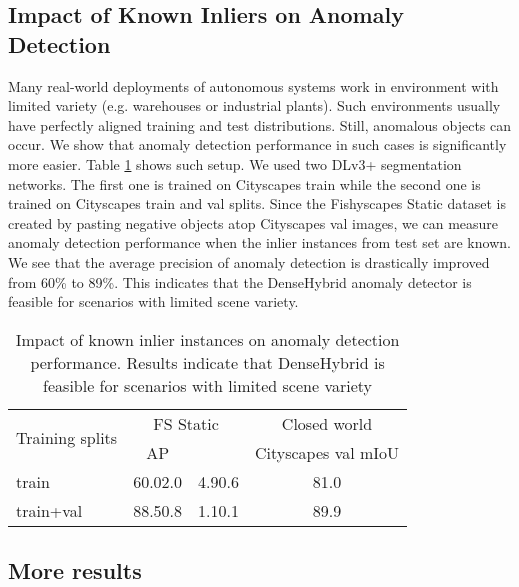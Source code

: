 \documentclass[runningheads]{llncs}
\begin{document}
\subsection{Impact of Known Inliers on Anomaly Detection}
Many real-world deployments of autonomous systems work in environment with limited variety (e.g. warehouses or industrial plants).
Such environments usually have perfectly aligned training and test distributions.
Still, anomalous objects can occur.
We show that anomaly detection performance in such cases is significantly more easier.
Table \ref{table:cityval} shows such setup.
We used two DLv3+ segmentation networks.
The first one is trained on Cityscapes train while the second one is trained on Cityscapes train and val splits.
Since the Fishyscapes Static dataset is created by pasting negative objects atop Cityscapes val images, we can measure anomaly detection performance when the inlier instances from test set are known.
We see that the average precision of anomaly detection is drastically improved from 60\% to 89\%.
This indicates that the DenseHybrid anomaly detector is feasible for scenarios with limited scene variety.
\begin{table}[h]
\begin{center}
\caption{
Impact of known inlier instances on anomaly detection performance.
Results indicate that DenseHybrid is feasible for scenarios with limited scene variety}
\label{table:cityval}
\begin{tabular}{lccc}
\hline \hline
\multirow{2}{*}{Training splits} & \multicolumn{2}{c|}{FS Static} & Closed world \\
 &  AP & \multicolumn{1}{c|}{} & Cityscapes val mIoU\\ \hline \hline
train  & 60.02.0 & 4.90.6 &  81.0\\
train+val &  88.50.8 & 1.10.1 & 89.9 \\ \hline
\end{tabular}
\end{center}
\end{table}

\subsection{More results}
\end{document}
